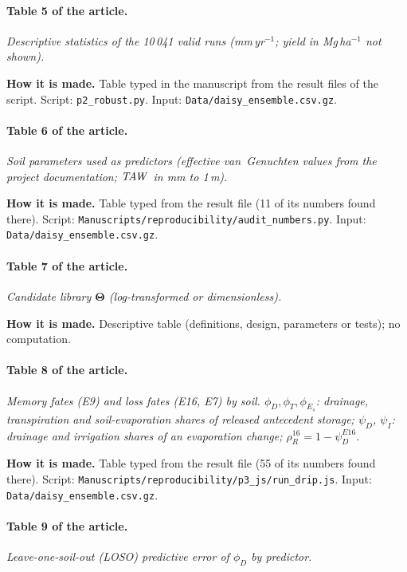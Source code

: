 \paragraph{Table 5 of the article.} \emph{Descriptive statistics of the 10\,041 valid runs (mm\,yr$^{-1}$; yield in Mg\,ha$^{-1}$ not shown).}

\textbf{How it is made.} Table typed in the manuscript from the result files of the script. Script: \nolinkurl{p2_robust.py}. Input: \nolinkurl{Data/daisy_ensemble.csv.gz}.

\paragraph{Table 6 of the article.} \emph{Soil parameters used as predictors (effective van~Genuchten values from the project documentation; $\mathit{TAW}$ in mm to 1\,m).}

\textbf{How it is made.} Table typed from the result file (11 of its numbers found there). Script: \nolinkurl{Manuscripts/reproducibility/audit_numbers.py}. Input: \nolinkurl{Data/daisy_ensemble.csv.gz}.

\paragraph{Table 7 of the article.} \emph{Candidate library $\boldsymbol\Theta$ (log-transformed or dimensionless).}

\textbf{How it is made.} Descriptive table (definitions, design, parameters or tests); no computation.

\paragraph{Table 8 of the article.} \emph{Memory fates (E9) and loss fates (E16, E7) by soil. $\phi_D,\phi_T,\phi_{E_s}$: drainage, transpiration and soil-evaporation shares of released antecedent storage; $\psi_D$, $\psi_I$: drainage and irrigation shares of an evaporation change; $\rho_R^{16}=1-\psi_D^{E16}$.}

\textbf{How it is made.} Table typed from the result file (55 of its numbers found there). Script: \nolinkurl{Manuscripts/reproducibility/p3_js/run_drip.js}. Input: \nolinkurl{Data/daisy_ensemble.csv.gz}.

\paragraph{Table 9 of the article.} \emph{Leave-one-soil-out (LOSO) predictive error of $\phi_D$ by predictor.}

